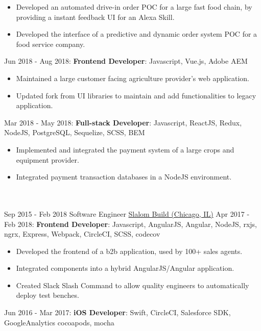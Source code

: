\documentclass[letterpaper]{template} %
\begin{document}
\begin{twenty}
        {\begin{itemize}
            \item Developed an automated drive-in order POC for a large fast food chain, by providing a instant feedback UI for an Alexa Skill.
            \item Developed the interface of a predictive and dynamic order system POC for a food service company.
        \end{itemize}}
    \twentyitem
    	{}
		{}
        {}
        {}
        {Jun 2018 - Aug 2018: \textbf{Frontend Developer}: Javascript, Vue.js, Adobe AEM}
        {\begin{itemize}
            \item Maintained a large customer facing agriculture provider's web application.
            \item Updated fork from UI libraries to maintain and add functionalities to legacy application.
        \end{itemize}}
    \twentyitem
    	{}
		{}
        {}
        {}
        {Mar 2018 - May 2018: \textbf{Full-stack Developer}: Javascript, ReactJS, Redux, NodeJS, PostgreSQL, Sequelize, SCSS, BEM}
        {\begin{itemize}
            \item Implemented and integrated the payment system of a large crops and equipment provider. 
            \item Integrated payment transaction databases in a NodeJS environment.
        \end{itemize}}
    \\\divider\\
    \twentyitem
        {Sep 2015 - Feb 2018}
        {}
        {Software Engineer}
        {\href{https://www.slalom.com/}{Slalom Build (Chicago, IL)}}
        {Apr 2017 - Feb 2018: \textbf{Frontend Developer}: Javascript, AngularJS, Angular, NodeJS, rxjs, ngrx, Express, Webpack, CircleCI, SCSS, codecov}
        {\begin{itemize}
            \item Developed the frontend of a b2b application, used by 100+ sales agents.
            \item Integrated components into a hybrid AngularJS/Angular application.
            \item Created Slack Slash Command to allow quality engineers to automatically deploy test benches.
        \end{itemize}}
    \twentyitem
    	{}
		{}
        {}
        {}
        {Jun 2016 - Mar 2017: \textbf{iOS Developer}: Swift, CircleCI, Salesforce SDK, GoogleAnalytics cocoapods, mocha}

\end{twenty}
\end{document}
